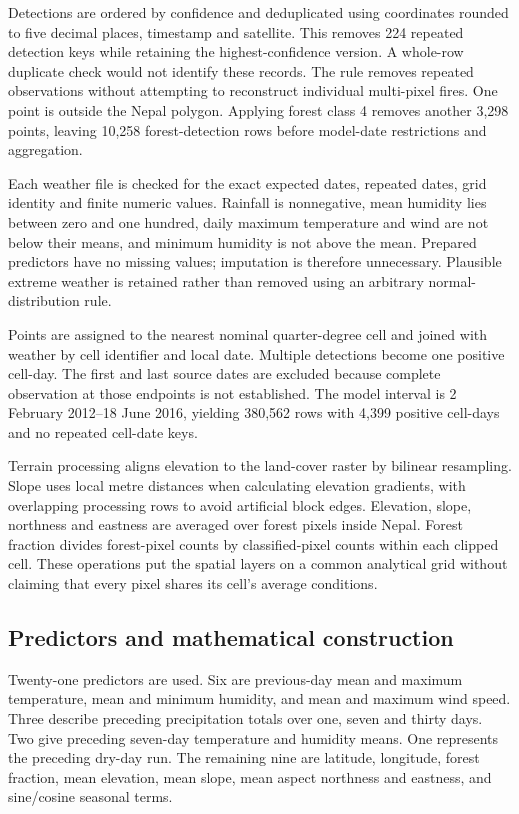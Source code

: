 \documentclass[conference,a4paper]{IEEEtran}
\begin{document}
Detections are ordered by confidence and deduplicated using coordinates rounded to five decimal places, timestamp and satellite. This removes 224 repeated detection keys while retaining the highest-confidence version. A whole-row duplicate check would not identify these records. The rule removes repeated observations without attempting to reconstruct individual multi-pixel fires. One point is outside the Nepal polygon. Applying forest class 4 removes another 3,298 points, leaving 10,258 forest-detection rows before model-date restrictions and aggregation.

Each weather file is checked for the exact expected dates, repeated dates, grid identity and finite numeric values. Rainfall is nonnegative, mean humidity lies between zero and one hundred, daily maximum temperature and wind are not below their means, and minimum humidity is not above the mean. Prepared predictors have no missing values; imputation is therefore unnecessary. Plausible extreme weather is retained rather than removed using an arbitrary normal-distribution rule.

Points are assigned to the nearest nominal quarter-degree cell and joined with weather by cell identifier and local date. Multiple detections become one positive cell-day. The first and last source dates are excluded because complete observation at those endpoints is not established. The model interval is 2 February 2012--18 June 2016, yielding 380,562 rows with 4,399 positive cell-days and no repeated cell-date keys.

Terrain processing aligns elevation to the land-cover raster by bilinear resampling. Slope uses local metre distances when calculating elevation gradients, with overlapping processing rows to avoid artificial block edges. Elevation, slope, northness and eastness are averaged over forest pixels inside Nepal. Forest fraction divides forest-pixel counts by classified-pixel counts within each clipped cell. These operations put the spatial layers on a common analytical grid without claiming that every pixel shares its cell's average conditions.

\subsection{Predictors and mathematical construction}
Twenty-one predictors are used. Six are previous-day mean and maximum temperature, mean and minimum humidity, and mean and maximum wind speed. Three describe preceding precipitation totals over one, seven and thirty days. Two give preceding seven-day temperature and humidity means. One represents the preceding dry-day run. The remaining nine are latitude, longitude, forest fraction, mean elevation, mean slope, mean aspect northness and eastness, and sine/cosine seasonal terms.
\end{document}
